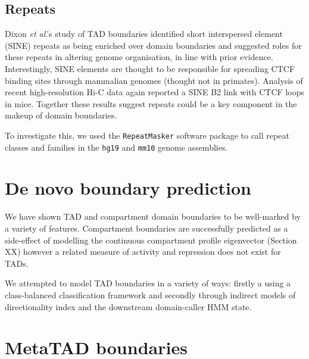 \documentclass[a4paper,10pt,oneside]{book}
\begin{document}

\subsection{Repeats}

Dixon \emph{et al}.'s study of TAD boundaries identified short interspersed element (SINE) repeats as being enriched over domain boundaries and suggested roles for these repeats in altering genome organisation, in line with prior evidence.\cite{Dixon2012, Lunyak2007} Interestingly, SINE elements are thought to be responsible for spreading CTCF binding sites through mammalian genomes\cite{Schmidt2012} (thought not in primates\cite{Schwalie2013}). Analysis of recent high-resolution Hi-C data again reported a SINE B2 link with CTCF loops in mice.\cite{Rao2014} Together these results suggest repeats could be a key component in the makeup of domain boundaries.

To investigate this, we used the \texttt{RepeatMasker}\cite{Tarailo-Graovac2009} software package to call repeat classes and families in the \texttt{hg19} and \texttt{mm10} genome assemblies.


\section{De novo boundary prediction}

We have shown TAD and compartment domain boundaries to be well-marked by a variety of features. Compartment boundaries are successfully predicted as a side-effect of modelling the continuous compartment profile eigenvector (Section XX) however a related measure of activity and repression does not exist for TADs.

We attempted to model TAD boundaries in a variety of ways: firstly a using a class-balanced classification framework and secondly through indirect models of directionality index and the downstream domain-caller HMM state.\cite{Dixon2012}

\section{MetaTAD boundaries}
\end{document}
